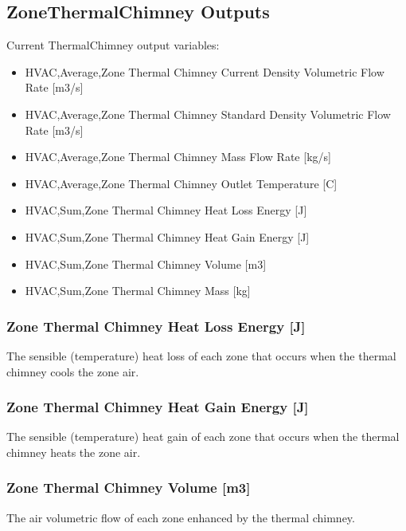 \subsection{ZoneThermalChimney Outputs}\label{zonethermalchimney-outputs}

Current ThermalChimney output variables:

\begin{itemize}
\item
  HVAC,Average,Zone Thermal Chimney Current Density Volumetric Flow Rate {[}m3/s{]}
\item
  HVAC,Average,Zone Thermal Chimney Standard Density Volumetric Flow Rate {[}m3/s{]}
\item
  HVAC,Average,Zone Thermal Chimney Mass Flow Rate {[}kg/s{]}
\item
  HVAC,Average,Zone Thermal Chimney Outlet Temperature {[}C{]}
\item
  HVAC,Sum,Zone Thermal Chimney Heat Loss Energy {[}J{]}
\item
  HVAC,Sum,Zone Thermal Chimney Heat Gain Energy {[}J{]}
\item
  HVAC,Sum,Zone Thermal Chimney Volume {[}m3{]}
\item
  HVAC,Sum,Zone Thermal Chimney Mass {[}kg{]}
\end{itemize}

\subsubsection{Zone Thermal Chimney Heat Loss Energy {[}J{]}}\label{zone-thermal-chimney-heat-loss-energy-j}

The sensible (temperature) heat loss of each zone that occurs when the thermal chimney cools the zone air.

\subsubsection{Zone Thermal Chimney Heat Gain Energy {[}J{]}}\label{zone-thermal-chimney-heat-gain-energy-j}

The sensible (temperature) heat gain of each zone that occurs when the thermal chimney heats the zone air.

\subsubsection{Zone Thermal Chimney Volume {[}m3{]}}\label{zone-thermal-chimney-volume-m3}

The air volumetric flow of each zone enhanced by the thermal chimney.

